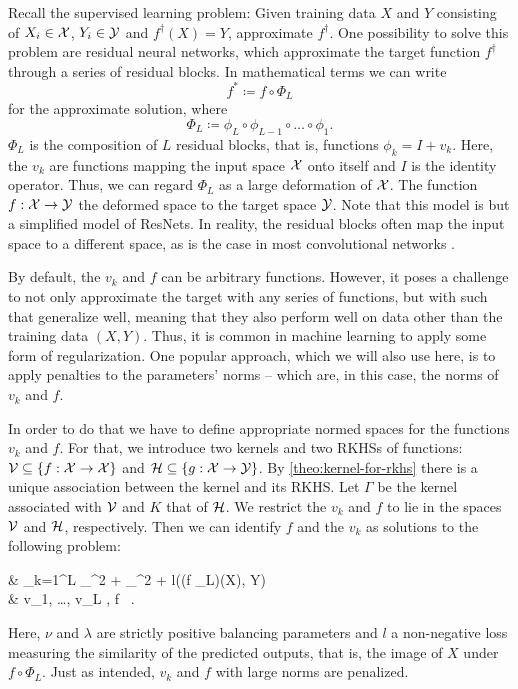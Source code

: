 Recall the supervised learning problem: Given training data $X$ and $Y$ consisting of $X_i \in \mathcal{X}$, $Y_i \in \mathcal{Y}$ and $f^\dagger(X) = Y$, approximate $f^\dagger$.
One possibility to solve this problem are residual neural networks, which approximate the target function $f^\dagger$ through a series of residual blocks.
In mathematical terms we can write
\begin{equation}
	f^\ast \coloneqq f \circ \Phi_L 
\end{equation}
for the approximate solution, where
\begin{equation}
	\label{eq:resnet-blocks}
	\Phi_L \coloneqq \phi_L \circ \phi_{L-1} \circ \ldots \circ \phi_1.
\end{equation} 
$\Phi_L$ is the composition of $L$ residual blocks, that is, functions $\phi_k = I + v_k$.
Here, the $v_k$ are functions mapping the input space $\mathcal{X}$ onto itself and $I$ is the identity operator.
Thus, we can regard $\Phi_L$ as a large deformation of $\mathcal{X}$.
The function $f: \mathcal{X} \to \mathcal{Y}$ the deformed space to the target space $\mathcal{Y}$.
Note that this model is but a simplified model of ResNets.
In reality, the residual blocks often map the input space to a different space, as is the case in most convolutional networks \cite{he16}.

By default, the $v_k$ and $f$ can be arbitrary functions.
However, it poses a challenge to not only approximate the target with any series of functions, but with such that generalize well, meaning that they also perform well on data other than the training data $(X, Y)$.
Thus, it is common in machine learning \cite{goodfellow16} to apply some form of regularization.
One popular approach, which we will also use here, is to apply penalties to the parameters' norms -- which are, in this case, the norms of $v_k$ and $f$.

In order to do that we have to define appropriate normed spaces for the functions $v_k$ and $f$.
For that, we introduce two kernels and two RKHSs of functions:
$\mathcal{V} \subseteq \{f: \mathcal{X} \rightarrow \mathcal{X}\}$ and $\mathcal{H} \subseteq \{g: \mathcal{X} \rightarrow \mathcal{Y}\}$.
By \cref{theo:kernel-for-rkhs} there is a unique association between the kernel and its RKHS.
Let $\Gamma$ be the kernel associated with $\mathcal{V}$ and $K$ that of $\mathcal{H}$.
We restrict the $v_k$ and $f$ to lie in the spaces $\mathcal{V}$ and $\mathcal{H}$, respectively.
Then we can identify $f$ and the $v_k$ as solutions to the following problem:
\begin{problem}
	\label{prob:min-v-f}
	\begin{cases}
		 & \nu \cdot {} \sum_{k=1}^{L} _\cV^2
		+ \lambda {}_\cH^2 
		+ l((f \circ \Phi_L)(X), Y) \\
		 & v_1, \ldots, v_L \in \cV, f \in \cH \ .
	\end{cases}
\end{problem}
Here, $\nu$ and $\lambda$ are strictly positive balancing parameters and $l$ a non-negative loss measuring the similarity of the predicted outputs, that is, the image of $X$ under $f \circ \Phi_L$.
Just as intended, $v_k$ and $f$ with large norms are penalized.

